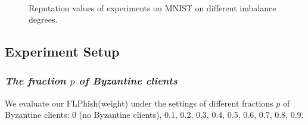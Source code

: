 \documentclass[lettersize,journal]{IEEEtran}
\begin{document}
\begin{figure}[!htp]
  \\
  \caption{Reputation values of experiments on MNIST on different imbalance degrees.}
  \label{fig_exp_reputation}
  \vspace{0.2in}
\end{figure}


\subsection{Experiment Setup}


  \subsubsection{{\textit{The fraction {$p$} of Byzantine clients}}} We evaluate our FLPhish(weight) under the settings of different fractions $p$ of Byzantine clients: 0 (no Byzantine clients), 0.1, 0.2, 0.3, 0.4, 0.5, 0.6, 0.7, 0.8, 0.9.
\end{document}
